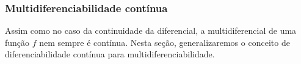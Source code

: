 \subsubsection{Multidiferenciabilidade contínua}

Assim como no caso da continuidade da diferencial, a multidiferencial de uma função $f$ nem sempre é contínua. Nesta seção, generalizaremos o conceito de diferenciabilidade contínua para multidiferenciabilidade.

\begin{comment}
\begin{definition}[Multidiferenciabilidade contínua]
Sejam $\bm E$ e $\bm E'$ espaços normados, $A \subseteq E$ um aberto e $X \subseteq A$. Para todo $m \in \NN$, definimos indutivamente:
	\begin{enumerate}
	\item Uma função de $A$ para $E'$ \emph{$\Cont^0$-diferenciável} (ou \emph{continuamente $0$-diferenciável}) \emph{em $X$} (ou \emph{em $x$} para $X = \{x\}$) é uma função $\fun{f}{A}{E'}$ contínua em $X$.

	Uma função de $A$ para $E'$ \emph{$\Cont^0$-diferenciável} (ou \emph{continuamente $0$-diferenciável}) é uma função contínua $\fun{f}{A}{E'}$ e o conjunto dessas funções é denotado $\Cont^0(\bm A,\bm E') := \Cont(\bm A,\bm E')$.

	\item Uma função de $A$ para $E'$ \emph{$\Cont^m$-diferenciável} (ou \emph{continuamente $m$-diferenciável}) \emph{em $X$} (ou \emph{em $x$} para $X = \{x\}$) é uma função $\fun{f}{A}{E'}$ tal que, para alguma vizinhança $V \subseteq A$ de $X$, $f$ é diferenciável em $V$ e sua diferencial $\fun{\D f}{V}{\toplin(\bm E, \bm E')}$ é $\Cont^{m-1}$-diferenciável em $X$.


	Uma função \emph{$\Cont^m$-diferenciável} (ou \emph{continuamente $m$-diferenciável}) de $A$ para $E'$ é uma função $\fun{f}{A}{E'}$ $\Cont^m$-diferenciável em $A$ e o conjunto dessas funções é denotado $\Cont^m(\bm A,\bm E')$.

	\item Uma função de $A$ para $E'$ \emph{$\Cont^\infty$-diferenciável} (ou \emph{continuamente $\infty$-diferenciável} ou \emph{suave}) \emph{em $X$} (ou \emph{em $x$} para $X = \{x\}$) é uma função $\fun{f}{A}{E'}$ tal que, para todo $m \in \N$, $f$ é $\Cont^{m}$-diferenciável em $X$.


\end{comment}
